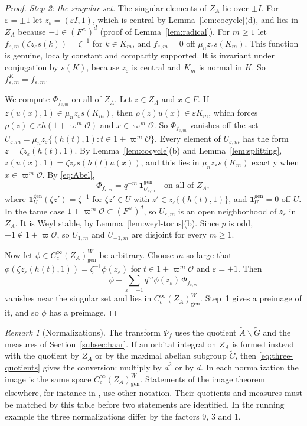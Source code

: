 \documentclass[12pt,letterpaper]{article}
\numberwithin{equation}{section}
\theoremstyle{plain}
\theoremstyle{definition}
\theoremstyle{remark}
\newtheorem{remark}[theorem]{Remark}
\newcommand{\Gt}{\widetilde G}
\newcommand{\At}{\widetilde A}
\newcommand{\Ct}{\widetilde C}
\newcommand{\Of}{\mathcal O}
\newcommand{\ZA}{Z_A}
\newcommand{\gen}{\mathrm{gen}}
\begin{document}
\begin{proof}
\emph{Step 2: the singular set.} The singular elements of $\ZA$ lie over
$\pm I$. For $\varepsilon=\pm1$ let $z_\varepsilon=(\varepsilon I,1)$,
which is central by Lemma~\ref{lem:cocycle}(d), and lies in $\ZA$
because $-1\in(F^\times)^d$ (proof of Lemma~\ref{lem:radical}). For
$m\ge1$ let
$f_{\varepsilon,m}(\zeta z_\varepsilon s(k))=\zeta^{-1}$ for
$k\in K_m$, and $f_{\varepsilon,m}=0$ off $\mu_nz_\varepsilon s(K_m)$.
This function is genuine, locally constant and compactly supported. It
is invariant under conjugation by $s(K)$, because $z_\varepsilon$ is
central and $K_m$ is normal in $K$. So $f_{\varepsilon,m}^K=
f_{\varepsilon,m}$.

We compute $\Phi_{f_{\varepsilon,m}}$ on all of $\ZA$. Let $z\in\ZA$ and
$x\in F$. If $z(u(x),1)\in\mu_nz_\varepsilon s(K_m)$, then
$\rho(z)u(x)\in\varepsilon K_m$, which forces
$\rho(z)\in\varepsilon h(1+\varpi^m\Of)$ and $x\in\varpi^m\Of$. So
$\Phi_{f_{\varepsilon,m}}$ vanishes off the set
$U_{\varepsilon,m}=\mu_nz_\varepsilon\{(h(t),1):t\in1+\varpi^m\Of\}$.
Every element of $U_{\varepsilon,m}$ has the form
$z=\zeta z_\varepsilon(h(t),1)$. By Lemma~\ref{lem:cocycle}(b) and
Lemma~\ref{lem:splitting}, $z(u(x),1)=\zeta z_\varepsilon s(h(t)u(x))$,
and this lies in $\mu_nz_\varepsilon s(K_m)$ exactly when
$x\in\varpi^m\Of$. By \eqref{eq:Abel},
\[
\Phi_{f_{\varepsilon,m}}=q^{-m}\,\mathbf 1^{\gen}_{U_{\varepsilon,m}}
\quad\text{on all of }\ZA,
\]
where $\mathbf 1^{\gen}_{U}(\zeta z')=\zeta^{-1}$ for $\zeta z'\in U$ with
$z'\in z_\varepsilon\{(h(t),1)\}$, and $\mathbf 1^{\gen}_U=0$ off $U$. In
the tame case $1+\varpi^m\Of\subset(F^\times)^d$, so $U_{\varepsilon,m}$
is an open neighborhood of $z_\varepsilon$ in $\ZA$. It is Weyl stable,
by Lemma~\ref{lem:weyl-torus}(b). Since $p$ is odd, $-1\notin
1+\varpi\Of$, so $U_{1,m}$ and $U_{-1,m}$ are disjoint for every
$m\ge1$.

Now let $\phi\in C_c^\infty(\ZA)_\gen^W$ be arbitrary. Choose $m$ so
large that $\phi(\zeta z_\varepsilon(h(t),1))=\zeta^{-1}
\phi(z_\varepsilon)$ for $t\in1+\varpi^m\Of$ and $\varepsilon=\pm1$.
Then
\[
\phi-\sum_{\varepsilon=\pm1}q^m\phi(z_\varepsilon)\,
\Phi_{f_{\varepsilon,m}}
\]
vanishes near the singular set and lies in $C_c^\infty(\ZA)_\gen^W$.
Step~1 gives a preimage of it, and so $\phi$ has a preimage.
\end{proof}

\begin{remark}[Normalizations]
\label{rem:image-jo01}
The transform $\Phi_f$ uses the quotient $\At\backslash\Gt$ and the
measures of Section~\ref{subsec:haar}. If an orbital integral on $\ZA$
is formed instead with the quotient by $\ZA$ or by the maximal abelian
subgroup $\Ct$, then \eqref{eq:three-quotients} gives the conversion:
multiply by $d^2$ or by $d$. In each normalization the image is the
same space $C_c^\infty(\ZA)_\gen^W$. Statements of the image theorem
elsewhere, for instance in \cite{Jo01}, use other notation. Their
quotients and measures must be matched by this table before two
statements are identified. In the running example the three
normalizations differ by the factors $9$, $3$ and $1$.
\end{remark}
\end{document}
